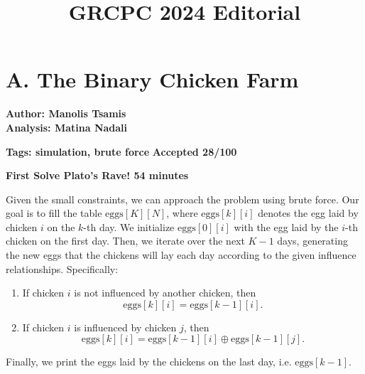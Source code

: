 \documentclass{article}
\title{GRCPC 2024 Editorial}
\date{}
\begin{document}
\maketitle





\section*{A. The Binary Chicken Farm}

\textbf{Author: Manolis Tsamis} \\
\textbf{Analysis: Matina Nadali}

\vspace{2em}
\noindent \textbf{Tags: simulation, brute force} 
\hfill \textbf{Accepted 28/100}

\hfill \textbf{First Solve Plato's Rave! 54 minutes}

\vspace{2em}

\noindent Given the small constraints, we can approach the problem using brute force. Our goal is to fill the table \(\text{eggs}[K][N]\), where \(\text{eggs}[k][i]\) denotes the egg laid by chicken \(i\) on the \(k\)-th day. We initialize \(\text{eggs}[0][i]\) with the egg laid by the \(i\)-th chicken on the first day. Then, we iterate over the next \(K - 1\) days, generating the new eggs that the chickens will lay each day according to the given influence relationships. Specifically:

\begin{enumerate}
    \item If chicken \(i\) is not influenced by another chicken, then
    \[
        \text{eggs}[k][i] = \text{eggs}[k - 1][i].
    \]
    \item If chicken \(i\) is influenced by chicken \(j\), then
    \[
        \text{eggs}[k][i] = \text{eggs}[k - 1][i] \oplus \text{eggs}[k - 1][j].
    \]
\end{enumerate}

Finally, we print the eggs laid by the chickens on the last day, i.e. $\text{eggs}[k - 1]$.

\vspace{1em}
\end{document}
